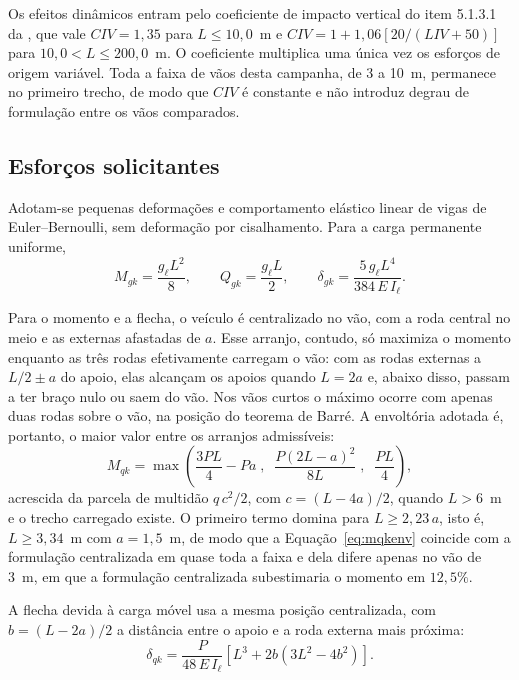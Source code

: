 Os efeitos dinâmicos entram pelo coeficiente de impacto vertical do item 5.1.3.1 da \textcite{nbr7188}, que vale $CIV=1{,}35$ para $L\leq10{,}0$~m e $CIV=1+1{,}06\left[20/(LIV+50)\right]$ para $10{,}0<L\leq200{,}0$~m. O coeficiente multiplica uma única vez os esforços de origem variável. Toda a faixa de vãos desta campanha, de 3 a 10~m, permanece no primeiro trecho, de modo que $CIV$ é constante e não introduz degrau de formulação entre os vãos comparados.

\subsection{Esforços solicitantes}\label{sec:esforcos}

Adotam-se pequenas deformações e comportamento elástico linear de vigas de Euler--Bernoulli, sem deformação por cisalhamento. Para a carga permanente uniforme,
\begin{equation}
M_{gk}=\frac{g_\ell L^2}{8},\qquad
Q_{gk}=\frac{g_\ell L}{2},\qquad
\delta_{gk}=\frac{5\,g_\ell L^4}{384\,E\,I_\ell}.
\label{eq:permanentes}
\end{equation}

Para o momento e a flecha, o veículo é centralizado no vão, com a roda central no meio e as externas afastadas de $a$. Esse arranjo, contudo, só maximiza o momento enquanto as três rodas efetivamente carregam o vão: com as rodas externas a $L/2\pm a$ do apoio, elas alcançam os apoios quando $L=2a$ e, abaixo disso, passam a ter braço nulo ou saem do vão. Nos vãos curtos o máximo ocorre com apenas duas rodas sobre o vão, na posição do teorema de Barré. A envoltória adotada é, portanto, o maior valor entre os arranjos admissíveis:
\begin{equation}
M_{qk}=\max\left(\frac{3PL}{4}-Pa\;,\;\;\frac{P(2L-a)^2}{8L}\;,\;\;\frac{PL}{4}\right),
\label{eq:mqkenv}
\end{equation}
acrescida da parcela de multidão $q\,c^2/2$, com $c=(L-4a)/2$, quando $L>6$~m e o trecho carregado existe. O primeiro termo domina para $L\geq2{,}23\,a$, isto é, $L\geq3{,}34$~m com $a=1{,}5$~m, de modo que a Equação~\eqref{eq:mqkenv} coincide com a formulação centralizada em quase toda a faixa e dela difere apenas no vão de 3~m, em que a formulação centralizada subestimaria o momento em $12{,}5\%$.

A flecha devida à carga móvel usa a mesma posição centralizada, com $b=(L-2a)/2$ a distância entre o apoio e a roda externa mais próxima:
\begin{equation}
\delta_{qk}=\frac{P}{48\,E\,I_\ell}\left[L^3+2b\left(3L^2-4b^2\right)\right].
\label{eq:flechaq}
\end{equation}

